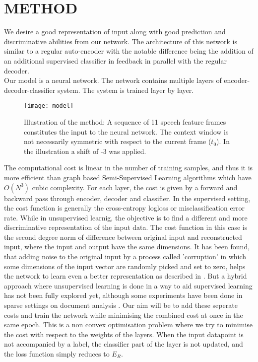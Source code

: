 \section{METHOD}
\label{sec:method}
 We desire a good representation of input along with good prediction and discriminative abilities from our network.
 The architecture of this network is similar to a regular auto-encoder with the notable difference being the addition of an additional supervised classifier in feedback in parallel with the regular decoder.  \\
Our model is a neural network. The network contains multiple layers of encoder-decoder-classifier system. The system is trained layer by layer.

\begin{figure}
\texttt{[image: model]}
\caption{Illustration of the method: A sequence of 11 speech feature frames constitutes the input to the neural network. The context window is not necessarily symmetric with respect to the current frame ($t_0$). In the illustration a shift of -3 was applied.}
\label{fig:model}
\end{figure}

The computational cost is linear in the number of training samples, and thus it is more efficient than graph based Semi-Supervised Learning algorithms which have $O(N^{3})$ cubic complexity. For each layer, the cost is given by a forward and backward pass through encoder, decoder and classifier. 
In the supervised setting, the cost function is generally the cross-entropy logloss or misclassification error rate. While in unsupervised learnig, the objective is to find a different and more discriminative representation of the input data. The cost function in this case is the second degree norm of difference between original input and reconstructed input, where the input and output have the same dimensions. It has been found, that adding noise to the original input by a process called 'corruption' in which some dimensions of the input vector are randomly picked and set to zero, helps the network to learn even a better representation as described in \cite{Bengio-nips-2006}. But a hybrid approach where unsupervised learning is done in a way to aid supervised learning has not been fully explored yet, although some experiments have been done in sparse settings on document analysis \cite{ranzato-2008}. Our aim will be to add these seperate costs and train the network while minimising the combined cost at once in the same epoch. This is a non convex optimisation problem where we try to minimise the cost with respect to the weights of the layers.  When the input datapoint is not accompanied by a label, the classifier part of the layer is not updated, and the loss function simply reduces to $E_{R}$.  \\

